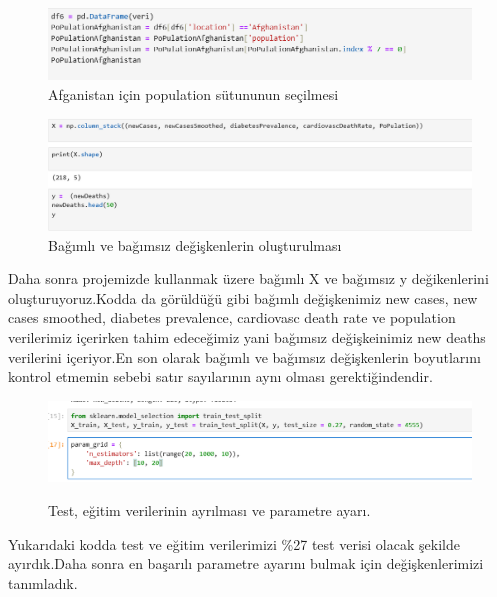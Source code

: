 \documentclass[12pt, a4paper]{article}
\begin{document}
	\begin{figure}[!htbp] 
		
		\centering
		\includegraphics[angle=0, width=\textwidth]{8.png}
		\caption{Afganistan için population sütununun seçilmesi}
	\end{figure}
	\begin{figure}[!htbp] 
		
		\centering
		\includegraphics[angle=0, width=\textwidth]{9.png}
		\caption{Bağımlı ve bağımsız değişkenlerin oluşturulması}
	\end{figure}
	\newline
	\newpage
	Daha sonra projemizde kullanmak üzere bağımlı X ve bağımsız y değikenlerini oluşturuyoruz.Kodda da görüldüğü gibi bağımlı değişkenimiz new cases, new cases smoothed, diabetes prevalence, cardiovasc death rate ve population verilerimiz içerirken tahim edeceğimiz yani bağımsız değişkeinimiz new deaths verilerini içeriyor.En son olarak bağımlı ve bağımsız değişkenlerin boyutlarını kontrol etmemin sebebi satır sayılarının aynı olması gerektiğindendir.
	\newline
	\begin{figure}[!htbp] 
		
		\centering
		\includegraphics[angle=0, width=\textwidth]{10.png}
		\label{fig:yenietiket}
		\caption{Test, eğitim verilerinin ayrılması ve parametre ayarı.}
	\end{figure}
	\newline Yukarıdaki kodda test ve eğitim verilerimizi \%27 test verisi olacak şekilde ayırdık.Daha sonra en başarılı parametre ayarını bulmak için değişkenlerimizi tanımladık.
	
\end{document}
